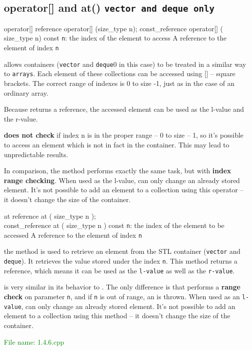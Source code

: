 
\subsection{operator[] and at() \texttt{vector and deque only}} %
\begin{methodinfo}
  {operator[]}
  {reference operator[] (size_type n); 
  const_reference operator[] ( size_type n) const}
  {\texttt{n}: the index of the element to access}
  {A reference to the element of index \texttt{n}}
  { allows containers (\texttt{vector} and \texttt{deque}0 in this case) 
  to be treated in a similar way to \texttt{arrays}. Each element of these collections can be accessed 
  using [] – square brackets. 
  The correct range of indexes is 0 to size -1, just as in the case of an ordinary array.

  Because  returns a reference, the accessed element can be used as the 
  l-value and the r-value.

   \textbf{does not check} if index n is in the proper range – 0 to size – 1, 
  so it’s possible to access an element which is not in fact in the container. This may lead to 
  unpredictable results.

  In comparison, the method  performs exactly the same task, but with 
  \textbf{index range checking}. When used as the l-value,  can only change 
  an already stored element. It’s not possible to add an element to a collection using this operator – 
  it doesn’t change the size of the container.}
\end{methodinfo}

\begin{methodinfo}
  {at}
  {reference at ( size_type n );\\
  const_reference at ( size_type n ) const}
  {\texttt{n}: the index of the element to be accessed}
  {A reference to the element of index \texttt{n}}
  {the method  is used to retrieve an element from the STL container (\texttt{vector} and 
  \texttt{deque}). It retrieves the value stored under the index \texttt{n}. This method returns a 
  reference, which means it can be used as the \texttt{l-value} as well as the \texttt{r-value}.

   is very similar in its behavior to . The only difference 
  is that  performs a \textbf{range check} on parameter \texttt{n}, and if \texttt{n} 
  is out of range, an  is thrown. When used as an \texttt{l-value}, 
   can only change an already stored element. It’s not possible to add an element to 
  a collection using this method – it doesn’t change the size of the container.}
\end{methodinfo}

\textcolor{green}{File name: 1.4.6.cpp}


